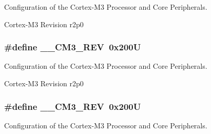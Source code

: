 Configuration of the Cortex-\/\-M3 Processor and Core Peripherals. 

Cortex-\/\-M3 Revision r2p0 \hypertarget{group___configuration__section__for___c_m_s_i_s_gac6a3f185c4640e06443c18b3c8d93f53}{
\subsubsection[{\-\_\-\-\_\-\-C\-M3\-\_\-\-R\-E\-V}]{\setlength{\rightskip}{0pt plus 5cm}\#define \-\_\-\-\_\-\-C\-M3\-\_\-\-R\-E\-V~0x200\-U}}\label{group___configuration__section__for___c_m_s_i_s_gac6a3f185c4640e06443c18b3c8d93f53}


Configuration of the Cortex-\/\-M3 Processor and Core Peripherals. 

Cortex-\/\-M3 Revision r2p0 \hypertarget{group___configuration__section__for___c_m_s_i_s_gac6a3f185c4640e06443c18b3c8d93f53}{
\subsubsection[{\-\_\-\-\_\-\-C\-M3\-\_\-\-R\-E\-V}]{\setlength{\rightskip}{0pt plus 5cm}\#define \-\_\-\-\_\-\-C\-M3\-\_\-\-R\-E\-V~0x200\-U}}\label{group___configuration__section__for___c_m_s_i_s_gac6a3f185c4640e06443c18b3c8d93f53}


Configuration of the Cortex-\/\-M3 Processor and Core Peripherals. 

